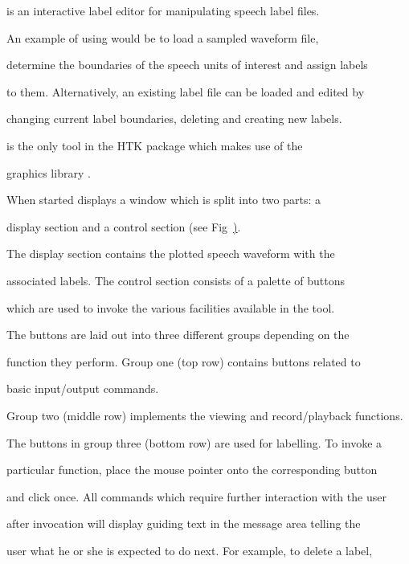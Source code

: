 






 is an interactive label editor for manipulating speech label files. 


An example of using  would be to load a sampled waveform file, 


determine the boundaries of the speech units of interest and assign labels 


to them. Alternatively, an existing label file can be loaded and edited by


changing current label boundaries, deleting and creating new labels.


 is the only tool in the HTK package which makes use of the 


graphics library .





When started  displays a window which is split into two parts: a


display section and a control section (see Fig~\href{f:hslab}). 


The display section contains the plotted speech waveform with the 


associated labels. The control section consists of a palette of buttons 


which are used to invoke the various facilities available in the tool. 


The buttons are laid out into three different groups depending on the 


function they perform. Group one (top row) contains buttons related to 


basic input/output commands. 


Group two (middle row) implements the viewing and record/playback functions. 


The buttons in group three (bottom row) are used for labelling. To invoke a 


particular function, place the mouse pointer onto the corresponding button 


and click once. All commands which require further interaction with the user 


after invocation will display guiding text in the message area telling the 


user what he or she is expected to do next. For example, to delete a label, 


